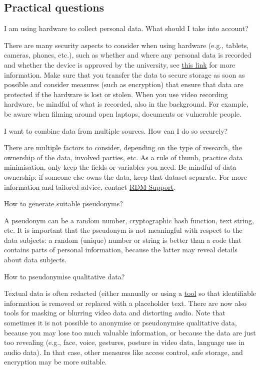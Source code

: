 \documentclass[
]{book}
\begin{document}
\hypertarget{practical-questions}{%
\subsection{Practical questions}\label{practical-questions}}

I am using hardware to collect personal data. What should I take into account?

There are many security aspects to consider when using hardware (e.g., tablets, cameras, phones, etc.), such as whether and where any personal data is recorded and whether the device is approved by the university, see \href{https://students.uu.nl/en/practical-information/it-facilities/information-security-at-the-uu}{this link} for more information. Make sure that you transfer the data to secure storage as soon as possible and consider measures (such as encryption) that ensure that data are protected if the hardware is lost or stolen. When you use video recording hardware, be mindful of what is recorded, also in the background. For example, be aware when filming around open laptops, documents or vulnerable people.

I want to combine data from multiple sources. How can I do so securely?

There are multiple factors to consider, depending on the type of research, the ownership of the data, involved parties, etc. As a rule of thumb, practice data minimisation, only keep the fields or variables you need. Be mindful of data ownership: if someone else owns the data, keep that dataset separate. For more information and tailored advice, contact \href{https://www.uu.nl/en/research/research-data-management/contact-us}{RDM Support}.

How to generate suitable pseudonyms?

A pseudonym can be a random number, cryptographic hash function, text string, etc. It is important that the pseudonym is not meaningful with respect to the data subjects: a random (unique) number or string is better than a code that contains parts of personal information, because the latter may reveal details about data subjects.

How to pseudonymise qualitative data?

Textual data is often redacted (either manually or using a \href{https://github.com/UtrechtUniversity/privacy-engineering-tools/tree/main/deidentification}{tool} so that identifiable information is removed or replaced with a placeholder text. There are now also tools for masking or blurring video data and distorting audio. Note that sometimes it is not possible to anonymise or pseudonymise qualitative data, because you may lose too much valuable information, or because the data are just too revealing (e.g., face, voice, gestures, posture in video data, language use in audio data). In that case, other measures like access control, safe storage, and encryption may be more suitable.
\end{document}
